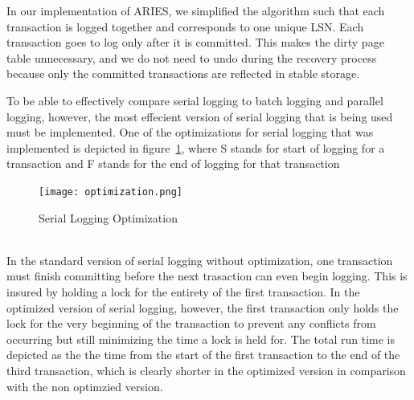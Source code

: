 In our implementation of ARIES, we simplified the algorithm such that each transaction is logged together and corresponds to one unique LSN. Each transaction goes to log only after it is committed. This makes the dirty page table unnecessary, and we do not need to undo during the recovery process because only the committed transactions are reflected in stable storage. \par

To be able to effectively compare serial logging to batch logging and parallel logging, however, the most effecient version of serial logging that is being used must be implemented. One of the optimizations for serial logging that was implemented is depicted in figure~\ref{optimization}, where S stands for start of logging for a transaction and F stands for the end of logging for that transaction\par

\begin{figure}[!h]
  \texttt{[image: optimization.png]}
  \caption{Serial Logging Optimization}
  \label{optimization}
\end{figure}\\

In the standard version of serial logging without optimization, one transaction must finish committing before the next trasaction can even begin logging. This is insured by holding a lock for the entirety of the first transaction. In the optimized version of serial logging, however, the first transaction only holds the lock for the very beginning of the transaction to prevent any conflicts from occurring but still minimizing the time a lock is held for. The total run time is depicted as the the time from the start of the first transaction to the end of the third transaction, which is clearly shorter in the optimized version in comparison with the non optimzied version. 
